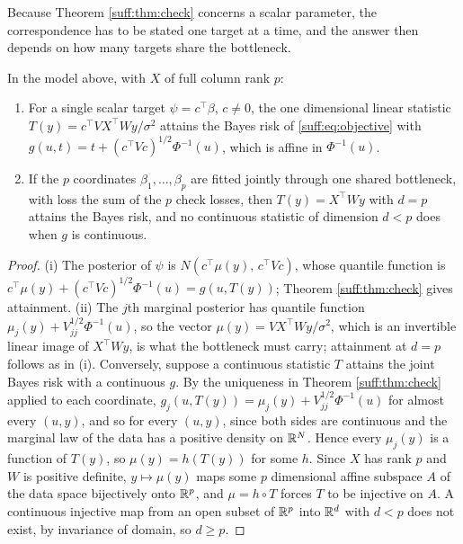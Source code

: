 Because Theorem \ref{suff:thm:check} concerns a scalar parameter, the correspondence has to be
stated one target at a time, and the answer then depends on how many targets share the
bottleneck.

\begin{proposition}
\label{suff:prop:linear}
In the model above, with $X$ of full column rank $p$:
\begin{enumerate}[label=(\roman*),leftmargin=2em,itemsep=1pt]
\item For a single scalar target $\psi=c^\top\beta$, $c\neq0$, the one dimensional linear
statistic $T(y)=c^\top VX^\top Wy/\sigma^2$ attains the Bayes risk of
\eqref{suff:eq:objective} with $g(u,t)=t+(c^\top Vc)^{1/2}\Phi^{-1}(u)$, which is affine in
$\Phi^{-1}(u)$.
\item If the $p$ coordinates $\beta_1,\dots,\beta_p$ are fitted jointly through one shared
bottleneck, with loss the sum of the $p$ check losses, then $T(y)=X^\top Wy$ with $d=p$
attains the Bayes risk, and no continuous statistic of dimension $d<p$ does when $g$ is continuous.
\end{enumerate}
\end{proposition}

\begin{proof}
(i) The posterior of $\psi$ is $N(c^\top\mu(y),\,c^\top Vc)$, whose quantile function is
$c^\top\mu(y)+(c^\top Vc)^{1/2}\Phi^{-1}(u)=g(u,T(y))$; Theorem \ref{suff:thm:check} gives
attainment. (ii) The $j$th marginal posterior has quantile function
$\mu_j(y)+V_{jj}^{1/2}\Phi^{-1}(u)$, so the vector $\mu(y)=VX^\top Wy/\sigma^2$, which is an
invertible linear image of $X^\top Wy$, is what the bottleneck must carry; attainment at
$d=p$ follows as in (i). Conversely, suppose a continuous statistic $T$ attains the joint Bayes risk with a continuous $g$. By
the uniqueness in Theorem \ref{suff:thm:check} applied to each coordinate, $g_j(u,T(y))=\mu_j(y)+V_{jj}^{1/2}\Phi^{-1}(u)$ for almost every $(u,y)$, and so for every $(u,y)$, since both sides are continuous and the marginal law of the data has a positive density on $\mathbb{R}^N$. Hence every $\mu_j(y)$ is
a function of $T(y)$, so $\mu(y)=h(T(y))$ for some $h$. Since $X$ has rank $p$ and $W$ is
positive definite, $y\mapsto\mu(y)$ maps some $p$ dimensional affine subspace $A$ of the data
space bijectively onto $\mathbb{R}^p$, and $\mu=h\circ T$ forces $T$ to be injective on $A$. A
continuous injective map from an open subset of $\mathbb{R}^p$ into $\mathbb{R}^d$ with $d<p$ does not exist,
by invariance of domain, so $d\ge p$.
\end{proof}


